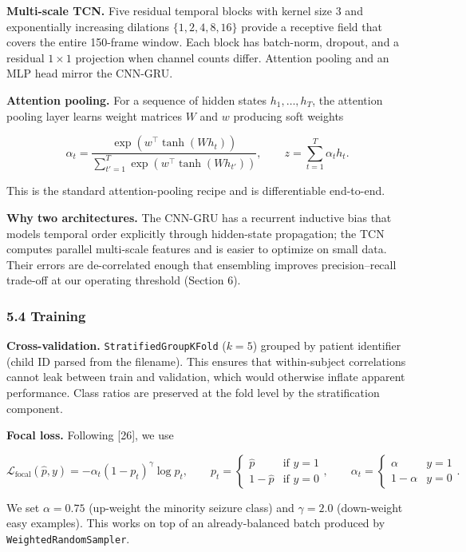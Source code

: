 \documentclass[
  11pt,
]{article}
\begin{document}
\textbf{Multi-scale TCN.} Five residual temporal blocks with kernel size
3 and exponentially increasing dilations \(\{1, 2, 4, 8, 16\}\) provide
a receptive field that covers the entire 150-frame window. Each block
has batch-norm, dropout, and a residual \(1 \times 1\) projection when
channel counts differ. Attention pooling and an MLP head mirror the
CNN-GRU.

\textbf{Attention pooling.} For a sequence of hidden states
\(h_1, \ldots, h_T\), the attention pooling layer learns weight matrices
\(W\) and \(w\) producing soft weights

\[\alpha_t = \frac{\exp(w^\top \tanh(W h_t))}{\sum_{t'=1}^{T} \exp(w^\top \tanh(W h_{t'}))}, \qquad z = \sum_{t=1}^{T} \alpha_t h_t.\]

This is the standard attention-pooling recipe and is differentiable
end-to-end.

\textbf{Why two architectures.} The CNN-GRU has a recurrent inductive
bias that models temporal order explicitly through hidden-state
propagation; the TCN computes parallel multi-scale features and is
easier to optimize on small data. Their errors are de-correlated enough
that ensembling improves precision--recall trade-off at our operating
threshold (Section 6).

\subsubsection{5.4 Training}\label{training}

\textbf{Cross-validation.} \texttt{StratifiedGroupKFold} (\(k=5\))
grouped by patient identifier (child ID parsed from the filename). This
ensures that within-subject correlations cannot leak between train and
validation, which would otherwise inflate apparent performance. Class
ratios are preserved at the fold level by the stratification component.

\textbf{Focal loss.} Following {[}26{]}, we use

\[\mathcal{L}_{\text{focal}}(\hat p, y) = -\alpha_t (1 - p_t)^\gamma \log p_t, \qquad p_t = \begin{cases} \hat p & \text{if } y = 1 \\ 1 - \hat p & \text{if } y = 0 \end{cases}, \qquad \alpha_t = \begin{cases} \alpha & y=1 \\ 1-\alpha & y=0 \end{cases}.\]

We set \(\alpha=0.75\) (up-weight the minority seizure class) and
\(\gamma=2.0\) (down-weight easy examples). This works on top of an
already-balanced batch produced by \texttt{WeightedRandomSampler}.
\end{document}
